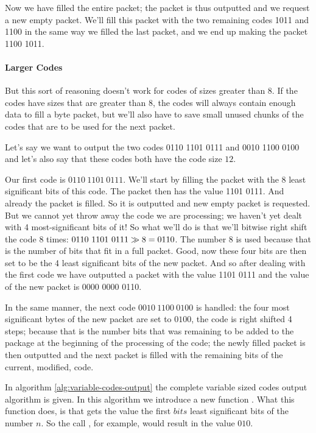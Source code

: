Now we have filled the entire packet; the packet is thus outputted and
we request a new empty packet. We'll fill this packet with the two
remaining codes 1011 and 1100 in the same way we filled the last
packet, and we end up making the packet  1100 1011.

\paragraph{Larger Codes}

But this sort of reasoning doesn't work for codes of sizes greater
than $8$. If the codes have sizes that are greater than $8$, the codes
will always contain enough data to fill a byte packet, but we'll also
have to save small unused chunks of the codes that are to be used for
the next packet.

Let's say we want to output the two codes 0110 1101 0111 and 0010 1100
0100 and let's also say that these codes both have the code size
$12$.

Our first code is $0110\ 1101\ 0111$. We'll start by filling the packet
with the 8 least significant bits of this code. The packet then has
the value 1101 0111. And already the packet is filled. So it is
outputted and new empty packet is requested. But we cannot yet throw
away the code we are processing; we haven't yet dealt with 4
most-significant bits of it! So what we'll do is that we'll bitwise
right shift the code 8 times: $0110\ 1101\ 0111 \ShiftRight 8 =
0110$. The number $8$ is used because that is the number of bits that
fit in a full packet. Good, now these four bits are then set to be the
4 least significant bits of the new packet. And so after dealing with
the first code we have outputted a packet with the value 1101 0111 and
the value of the new packet is 0000 0000 0110.

In the  same manner, the  next code $0010\  1100\ 0100$ is  handled: the
four most significant  bytes of the new packet are  set to $0100$, the
code is  right shifted 4 steps;  because that is the  number bits that
was  remaining to  be added  to the  package at  the beginning  of the
processing of the code; the  newly filled packet is then outputted and
the  next packet is  filled with  the remaining  bits of  the current,
modified, code.

In algorithm \ref{alg:variable-codes-output} the complete variable
sized codes output algorithm is given. In this algorithm we introduce
a new function . What
this function does, is that gets the value the first $bits$ least
significant bits of the number $n$. So the call
, for example, would result in the value
$010$.

